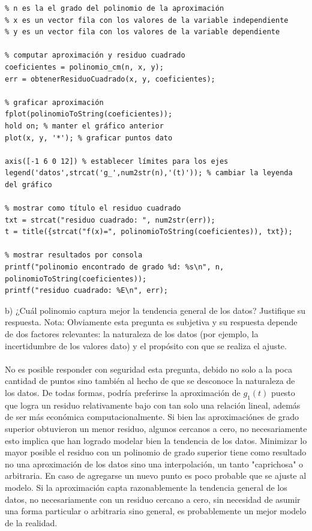 \documentclass{article}
\begin{document}
\begin{lstlisting}
% n es la el grado del polinomio de la aproximación
% x es un vector fila con los valores de la variable independiente
% y es un vector fila con los valores de la variable dependiente

% computar aproximación y residuo cuadrado
coeficientes = polinomio_cm(n, x, y);
err = obtenerResiduoCuadrado(x, y, coeficientes);

% graficar aproximación
fplot(polinomioToString(coeficientes));
hold on; % manter el gráfico anterior
plot(x, y, '*'); % graficar puntos dato

axis([-1 6 0 12]) % establecer límites para los ejes
legend('datos',strcat('g_',num2str(n),'(t)')); % cambiar la leyenda del gráfico

% mostrar como título el residuo cuadrado
txt = strcat("residuo cuadrado: ", num2str(err));
t = title({strcat("f(x)=", polinomioToString(coeficientes)), txt});

% mostrar resultados por consola
printf("polinomio encontrado de grado %d: %s\n", n, polinomioToString(coeficientes));
printf("residuo cuadrado: %E\n", err);
\end{lstlisting}
b) ¿Cuál polinomio captura mejor la tendencia general de los datos? Justifique su respuesta.
Nota: Obviamente esta pregunta es subjetiva y su respuesta depende de dos factores relevantes:
la naturaleza de los datos (por ejemplo, la incertidumbre de los valores dato) y el propósito con
que se realiza el ajuste.\\ \\
No es posible responder con seguridad esta pregunta, debido no solo a la poca cantidad de puntos sino también al hecho de que se desconoce la naturaleza de los datos. De todas formas, podría preferirse la aproximación de $g_1(t)$ puesto que logra un residuo relativamente bajo con tan solo una relación lineal, además de ser más económica computacionalmente. Si bien las aproximaciónes de grado superior obtuvieron un menor residuo, algunos cercanos a cero, no necesariamente esto implica que han logrado modelar bien la tendencia de los datos. Minimizar lo mayor posible el residuo con un polinomio de grado superior tiene como resultado no una aproximación de los datos sino una interpolación, un tanto "caprichosa" o arbitraria. En caso de agregarse un nuevo punto es poco probable que se ajuste al modelo. Si la aproximación capta razonablemente la tendencia general de los datos, no necesariamente con un residuo cercano a cero, sin necesidad de asumir una forma particular o arbitraria sino general, es probablemente un mejor modelo de la realidad.
\end{document}
